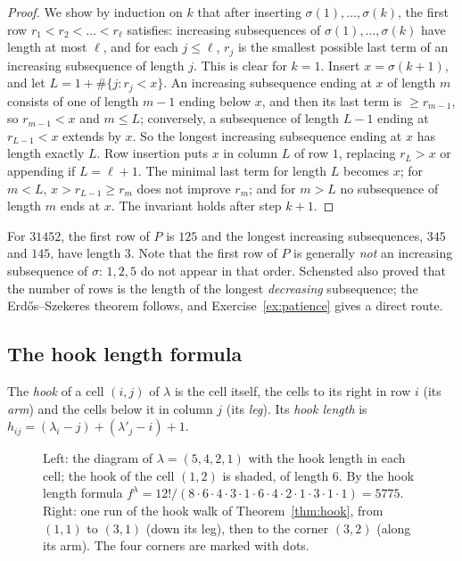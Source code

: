 \begin{proof}
We show by induction on $k$ that after inserting $\sigma(1),\dots,\sigma(k)$, the first row $r_1<r_2<\dots<r_\ell$ satisfies: increasing subsequences of $\sigma(1),\dots,\sigma(k)$ have length at most $\ell$, and for each $j\le\ell$, $r_j$ is the smallest
possible last term of an increasing subsequence of length $j$. This is clear for $k=1$. Insert $x=\sigma(k+1)$, and let $L=1+\#\{j:r_j<x\}$. An increasing subsequence ending at $x$ of length $m$ consists of one of length $m-1$
ending below $x$, and then its last term is $\ge r_{m-1}$, so $r_{m-1}<x$ and $m\le L$; conversely, a subsequence of length $L-1$ ending at $r_{L-1}<x$ extends by $x$. So the longest increasing subsequence ending at $x$ has length exactly $L$.
Row insertion puts $x$ in column $L$ of row $1$, replacing $r_L>x$ or appending if $L=\ell+1$. The minimal last term for length $L$ becomes $x$; for $m<L$, $x>r_{L-1}\ge r_m$ does not improve $r_m$; and for $m>L$ no subsequence of
length $m$ ends at $x$. The invariant holds after step $k+1$.
\end{proof}

For $31452$, the first row of $P$ is $125$ and the longest increasing subsequences, $345$ and $145$, have length $3$. Note that the first row of $P$ is generally \emph{not} an increasing subsequence of $\sigma$: $1,2,5$ do not appear in that
order. Schensted also proved that the number of rows is the length of the longest \emph{decreasing} subsequence; the Erdős--Szekeres theorem follows, and Exercise~\ref{ex:patience} gives a direct route.

\subsection*{The hook length formula}

\begin{definition}\label{def:hook}
The \emph{hook} of a cell $(i,j)$ of $\lambda$ is the cell itself, the cells to its right in row $i$ (its \emph{arm}) and the cells below it in column $j$ (its \emph{leg}). Its \emph{hook length} is
$h_{ij}=(\lambda_i-j)+(\lambda'_j-i)+1$.
\end{definition}

\begin{figure}[ht]
\centering
{}
\caption{Left: the diagram of $\lambda=(5,4,2,1)$ with the hook length in each cell; the hook of the cell $(1,2)$ is shaded, of length $6$. By the hook length formula $f^\lambda=12!/(8\cdot6\cdot4\cdot3\cdot1\cdot6\cdot4\cdot2\cdot1\cdot3\cdot1\cdot1)=5775$.
Right: one run of the hook walk of Theorem~\ref{thm:hook}, from $(1,1)$ to $(3,1)$ (down its leg), then to the corner $(3,2)$ (along its arm). The four corners are marked with dots.}
\label{fig:hooks}
\end{figure}

